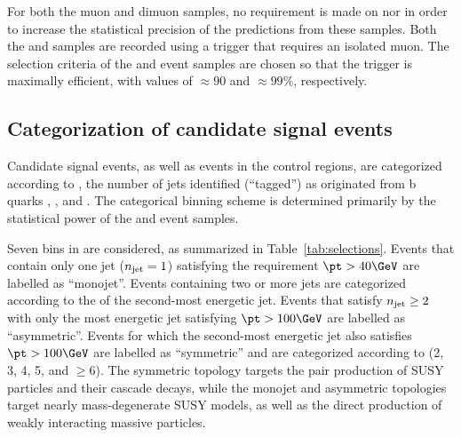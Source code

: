 For both the muon and dimuon samples, no requirement is made on
\alphat nor \bdphi in order to increase the statistical precision of
the predictions from these samples. Both the \mj and \mmj samples are
recorded using a trigger that requires an isolated muon. The selection
criteria of the \mj and \mmj event samples are chosen so that the
trigger is maximally efficient, with values of ${\approx}90$ and
${\approx}99\%$, respectively.


\subsection{Categorization of candidate signal events}
\label{sec:categorization}

Candidate signal events, as well as events in the control regions, are
categorized according to \njet, the number of jets identified
(``tagged'') as originated from b quarks \nb, \scalht, and \mht. The
categorical binning scheme is determined primarily by the statistical
power of the \mj and \mmj event samples.

Seven bins in \njet are considered, as summarized in
Table~\ref{tab:selections}. Events that contain only one jet ($n_{\text{jet}} =
1$) satisfying the requirement $\pt > 40\GeV$ are labelled as
``monojet''. Events containing two or more jets are categorized
according to the \pt of the second-most energetic jet. Events that
satisfy $n_{\text{jet}} \geq 2$ with only the most energetic jet satisfying
$\pt > 100\GeV$ are labelled as ``asymmetric''. Events for which the
second-most energetic jet also satisfies $\pt > 100\GeV$ are labelled
as ``symmetric'' and are categorized according to \njet (2, 3, 4, 5,
and $\geq$6). The symmetric topology targets the pair production of
SUSY particles and their cascade decays, while the monojet and
asymmetric topologies target nearly mass-degenerate SUSY models, as
well as the direct production of weakly interacting massive particles.

